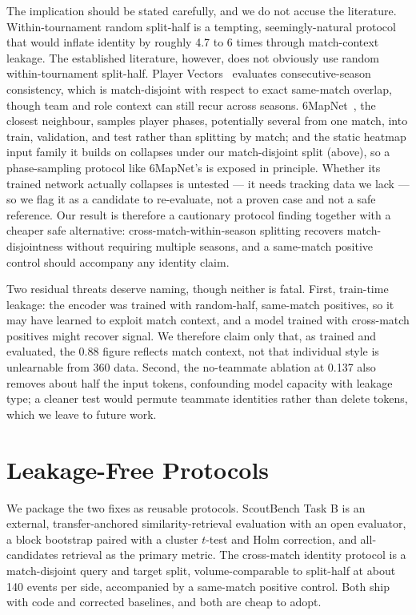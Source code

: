 The implication should be stated carefully, and we do not accuse the
literature. Within-tournament random split-half is a tempting,
seemingly-natural protocol that would inflate identity by roughly 4.7 to 6
times through match-context leakage. The established literature, however, does
not obviously use random within-tournament split-half. Player
Vectors~\cite{decroos2019playervectors} evaluates consecutive-season
consistency, which is match-disjoint with respect to exact same-match overlap,
though team and role context can still recur across seasons.
6MapNet~\cite{kim2021sixmapnet}, the closest neighbour, samples player phases,
potentially several from one match, into train, validation, and test rather
than splitting by match; and the static heatmap input family it builds on
collapses under our match-disjoint split (above), so a phase-sampling protocol
like 6MapNet's is exposed in principle. Whether its trained network actually
collapses is untested --- it needs tracking data we lack --- so we flag it as a
candidate to re-evaluate, not a proven case and not a safe reference. Our result is
therefore a cautionary protocol finding together with a cheaper safe
alternative: cross-match-within-season splitting recovers match-disjointness
without requiring multiple seasons, and a same-match positive control should
accompany any identity claim.

Two residual threats deserve naming, though neither is fatal. First, train-time
leakage: the encoder was trained with random-half, same-match positives, so it
may have learned to exploit match context, and a model trained with cross-match
positives might recover signal. We therefore claim only that, as trained and
evaluated, the 0.88 figure reflects match context, not that individual style is
unlearnable from 360 data. Second, the no-teammate ablation at 0.137 also
removes about half the input tokens, confounding model capacity with leakage
type; a cleaner test would permute teammate identities rather than delete
tokens, which we leave to future work.

\section{Leakage-Free Protocols}
\label{sec:protocols}

We package the two fixes as reusable protocols. ScoutBench Task B is an
external, transfer-anchored similarity-retrieval evaluation with an open
evaluator, a block bootstrap paired with a cluster $t$-test and Holm
correction, and all-candidates retrieval as the primary metric. The cross-match
identity protocol is a match-disjoint query and target split, volume-comparable
to split-half at about 140 events per side, accompanied by a same-match
positive control. Both ship with code and corrected baselines, and both are
cheap to adopt.

